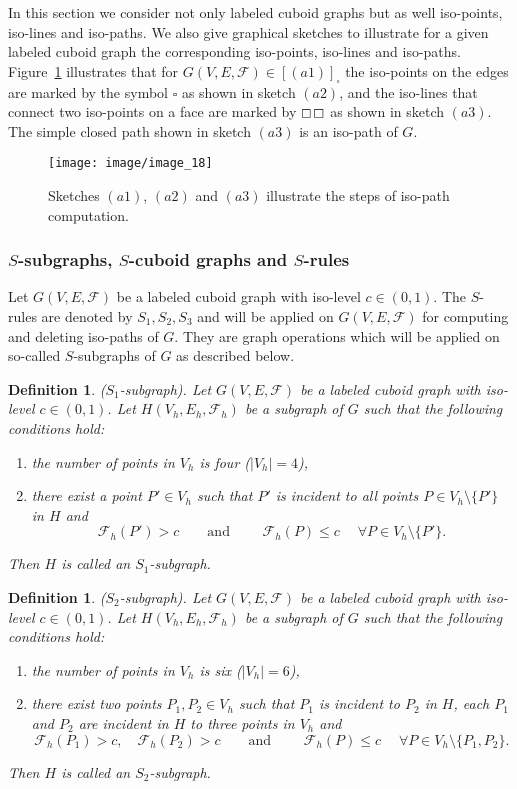 \documentclass[a4paper,11pt]{article}
\newtheorem{definition}[theorem]{Definition}
\begin{document}
In this section we consider not only labeled cuboid graphs but as well iso-points, iso-lines and iso-paths.
We also give graphical sketches to illustrate for a given labeled cuboid graph the corresponding iso-points,
iso-lines and iso-paths. Figure~\ref{image_18} illustrates that for $G(V,E,\mathcal{F})\in [(a1)]_{\square}$
the iso-points on the edges are marked by the symbol $\square$ as shown in sketch $(a2)$, and the iso-lines
that connect two iso-points on a face are marked by $\small{\boxempty}$\!\textminus\!\textminus\!$\small{\boxempty}$
as shown in sketch $(a3)$. The simple closed path shown in sketch $(a3)$ is an iso-path of $G$.
\begin{figure}[!ht]
\texttt{[image: image/image\_18]}
\caption{Sketches $(a1)$, $(a2)$ and $(a3)$ illustrate the steps of iso-path computation.}
\label{image_18}
\end{figure}
\FloatBarrier
\subsubsection{$S$-subgraphs, $S$-cuboid graphs and $S$-rules}
Let $G(V,E,\mathcal{F})$ be a labeled cuboid graph with iso-level $c\in (0,1)$. The $S$-rules are denoted
by $S_1,S_2,S_3$ and will be applied on $G(V,E,\mathcal{F})$ for computing and deleting iso-paths of
$G$. They are graph operations which will be applied on so-called $S$-subgraphs of $G$ as described below.

\begin{definition}($S_1$-subgraph). Let $G(V,E,\mathcal{F})$ be a labeled cuboid graph
with iso-level $c\in (0,1)$. Let $H(V_h,E_h,\mathcal{F}_h)$ be a subgraph of $G$ such that the following
conditions hold:
\begin{enumerate}
\item the number of points in $V_h$ is four ($|V_h|=4$),
\item there exist a point $P'\in V_h$ such that $P'$ is incident to all points $P\in V_h\setminus\{P'\}$ in $H$ and
\[
\mathcal{F}_h(P')>c\qquad\mbox{and } \qquad \mathcal{F}_h(P)\leq c \quad\;\forall P\in V_h\setminus\{P'\}.
\]
\end{enumerate}
Then $H$ is called an $S_1$-subgraph.
\label{def:iso-path-10}
\end{definition}

\begin{definition}($S_2$-subgraph). Let $G(V,E,\mathcal{F})$ be a labeled cuboid graph
with iso-level $c\in (0,1)$. Let $H(V_h,E_h,\mathcal{F}_h)$ be a subgraph of $G$ such that the following
conditions hold:
\begin{enumerate}
\item the number of points in $V_h$ is six ($|V_h|=6$),
\item there exist two points $P_1,P_2\in V_h$ such that $P_1$ is incident to $P_2$ in $H$,
each $P_1$ and $P_2$ are incident in $H$ to three points in $V_h$ and
\[
\mathcal{F}_h(P_1)>c, \quad\mathcal{F}_h(P_2)>c\qquad\mbox{and }\qquad
\mathcal{F}_h(P)\leq c \quad\;\forall P\in V_h\setminus\{P_1,P_2\}.
\]
\end{enumerate}
Then $H$ is called an $S_2$-subgraph.
\label{def:iso-path-11}
\end{definition}
\end{document}
